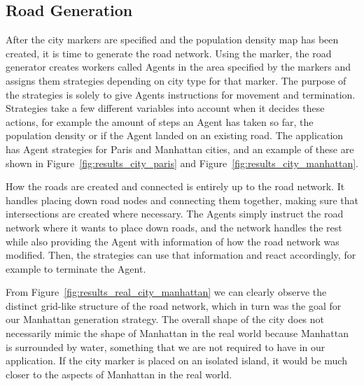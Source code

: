 \subsection{Road Generation}

After the city markers are specified and the population density map has been created, it is time to generate the road network.
Using the marker, the road generator creates workers called Agents in the area specified by the markers and assigns them strategies depending on city type for that marker.
The purpose of the strategies is solely to give Agents instructions for movement and termination.
Strategies take a few different variables into account when it decides these actions, for example the amount of steps an Agent has taken so far, the population density or if the Agent landed on an existing road.
The application has Agent strategies for Paris and Manhattan cities, and an example of these are shown in Figure~\ref{fig:results_city_paris} and Figure~\ref{fig:results_city_manhattan}.

How the roads are created and connected is entirely up to the road network.
It handles placing down road nodes and connecting them together, making sure that intersections are created where necessary.
The Agents simply instruct the road network where it wants to place down roads, and the network handles the rest while also providing the Agent with information of how the road network was modified.
Then, the strategies can use that information and react accordingly, for example to terminate the Agent.

From Figure~\ref{fig:results_real_city_manhattan} we can clearly observe the distinct grid-like structure of the road network, which in turn was the goal for our Manhattan generation strategy.
The overall shape of the city does not necessarily mimic the shape of Manhattan in the real world because Manhattan is surrounded by water, something that we are not required to have in our application.
If the city marker is placed on an isolated island, it would be much closer to the aspects of Manhattan in the real world.

